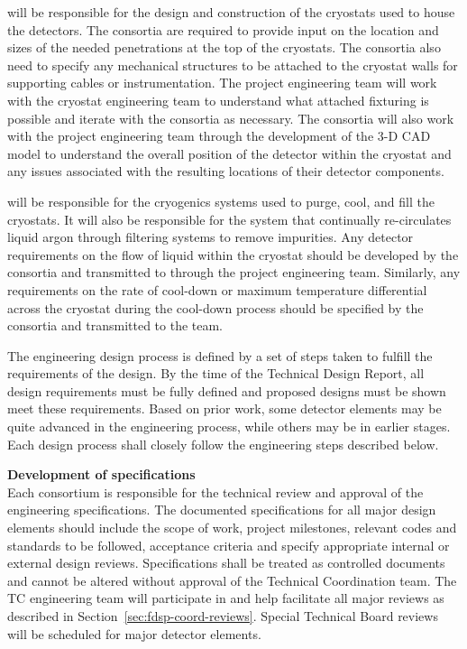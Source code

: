  will be responsible for the design and construction of the
cryostats used to house the detectors.  The consortia are required to
provide input on the location and sizes of the needed penetrations at
the top of the cryostats.  The consortia also need to specify any
mechanical structures to be attached to the cryostat walls for
supporting cables or instrumentation.  The  project engineering
team will work with the  cryostat engineering team to understand
what attached fixturing is possible and iterate with the consortia as
necessary.  The consortia will also work with the project engineering
team through the development of the 3-D CAD model to understand the
overall position of the detector within the cryostat and any issues
associated with the resulting locations of their detector components.

 will be responsible for the cryogenics systems used to purge,
cool, and fill the cryostats.  It will also be responsible for the
system that continually re-circulates liquid argon through filtering
systems to remove impurities.  Any detector requirements on the flow
of liquid within the cryostat should be developed by the consortia and
transmitted to  through the project engineering team.  Similarly,
any requirements on the rate of cool-down or maximum temperature
differential across the cryostat during the cool-down process should
be specified by the consortia and transmitted to the  team.

The engineering design process is defined by a set of steps taken to
fulfill the requirements of the design.  By the time of the Technical
Design Report, all design requirements must be fully defined and
proposed designs must be shown meet these requirements.  Based on
prior work, some detector elements may be quite advanced in the
engineering process, while others may be in earlier stages.  Each
design process shall closely follow the engineering steps described
below.


{\bf Development of specifications}\\ Each consortium is responsible
for the technical review and approval of the engineering
specifications.  The documented specifications for all major design
elements should include the scope of work, project milestones,
relevant codes and standards to be followed, acceptance criteria and
specify appropriate internal or external design reviews.
Specifications shall be treated as controlled documents and cannot be
altered without approval of the  Technical Coordination
team.  The TC engineering team will participate in and help facilitate
all major reviews as described in
Section~\ref{sec:fdsp-coord-reviews}.  Special Technical Board reviews
will be scheduled for major detector elements.

